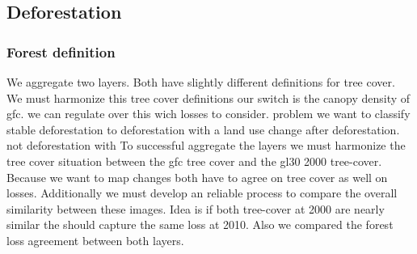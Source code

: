 	\subsection{Deforestation}
		\subsubsection{Forest definition}
			We aggregate two layers. Both have slightly different definitions for tree cover. We must harmonize this tree cover definitions
			our switch is the canopy density of gfc. we can regulate over this wich losses to consider. problem we want to classify stable deforestation to deforestation with a land use change after deforestation. not deforestation with 
			To successful aggregate the layers we must harmonize the tree cover situation between the gfc tree cover and the gl30 2000 tree-cover. Because we want to map changes both have to agree on tree cover as well on losses. Additionally we must develop an reliable process to compare the overall similarity between these images.
			Idea is if both tree-cover at 2000 are nearly similar the should capture the same loss at 2010. Also we compared the forest loss agreement between both layers.


